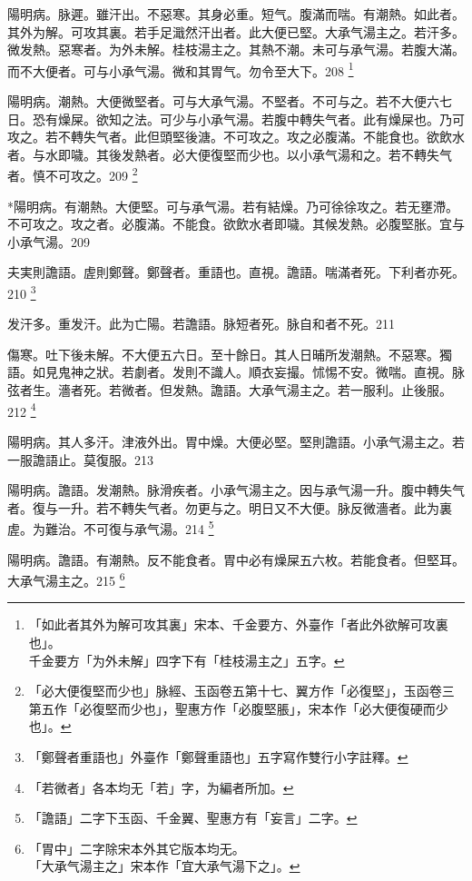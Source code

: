 陽明病。脉遲。雖汗出。不惡寒。其身必重。短气。腹滿而喘。有潮熱。如此者。其外为解。可攻其裏。若手足濈然汗出者。此大便已堅。{\khaaitp 大}承气湯主之。若汗多。微发熱。惡寒者。为外未解。{\khaaitp 桂枝湯主之。}其熱不潮。未可与承气湯。若腹大滿。而不大便者。可与小承气湯。微和其胃气。勿令至大下。208
	\footnote{「如此者其外为解可攻其裏」宋本、千金要方、外臺作「者此外欲解可攻裏也」。\\千金要方「为外未解」四字下有「桂枝湯主之」五字。}

陽明病。潮熱。大便微堅者。可与{\khaaitp 大}承气湯。不堅者。不可与之。若不大便六七日。恐有燥屎。欲知之法。可少与小承气湯。若腹中轉失气者。此有燥屎也。乃可攻之。若不轉失气者。此但頭堅後溏。不可攻之。攻之必腹滿。不能食也。欲飲水者。与水即噦。其後发熱者。必大便復堅而少也。以小承气湯和之。若不轉失气者。慎不可攻之。209
	\footnote{「必大便復堅而少也」脉經、玉函卷五第十七、翼方作「必復堅」，玉函卷三第五作「必復堅而少也」，聖惠方作「必腹堅脹」，宋本作「必大便復硬而少也」。}

*陽明病。有潮熱。大便堅。可与承气湯。若有結燥。乃可徐徐攻之。若无壅滯。不可攻之。攻之者。必腹滿。不能食。欲飲水者即噦。其候发熱。必腹堅胀。宜与小承气湯。{\gaoben}209

夫実則譫語。虗則鄭聲。鄭聲者。重語也。直視。譫語。喘滿者死。下利者亦死。210
	\footnote{「鄭聲者重語也」外臺作「鄭聲重語也」五字寫作雙行小字註釋。}

发汗多。重发汗。{\khaaitp 此为}亡陽。{\khaaitp 若}譫語。脉短者死。脉自和者不死。211

傷寒。吐下後未解。不大便五六日。至十餘日。其人日晡所发潮熱。不惡寒。獨語。如見鬼{\khaaitp 神之}狀。若劇者。发則不識人。順衣妄撮。怵惕不安。微喘。直視。脉弦者生。濇者死。{\khaaitp 若}微者。但发熱。譫語。{\khaaitp 大}承气湯主之。若一服利。止後服。212
	\footnote{「若微者」各本均无「若」字，为編者所加。}

陽明病。其人多汗。津液外出。胃中燥。大便必堅。堅則譫語。{\khaaitp 小}承气湯主之。{\khaaitp 若一服譫語止。莫復服。}213

陽明病。譫語。发潮熱。脉滑疾者。{\khaaitp 小}承气湯主之。因与承气湯一升。腹中轉失气者。復与一升。若不轉失气者。勿更与之。明日又不大便。脉反微濇者。此为裏虗。为難治。不可復与承气湯。214
	\footnote{「譫語」二字下玉函、千金翼、聖惠方有「妄言」二字。}

陽明病。譫語。有潮熱。反不能食者。{\khaaitp 胃中}必有燥屎五六枚。若能食者。但堅耳。{\khaaitp 大}承气湯主之。215
	\footnote{「胃中」二字除宋本外其它版本均无。\\「大承气湯主之」宋本作「宜大承气湯下之」。}

